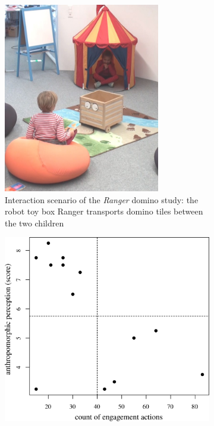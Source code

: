 \documentclass{frontiersSCNS} %
\begin{document}
\begin{figure}[b]
        \centering
        \begin{subfigure}[b]{0.48\columnwidth}
                \centering
                \includegraphics[width=0.75\textwidth]{ranger}
                \caption{Interaction scenario of the \emph{Ranger} domino study:
                the robot toy box Ranger transports domino tiles between the two
                children}
                \label{fig:ranger-expe}
        \end{subfigure}%
        \hspace{0.5cm}
        \begin{subfigure}[b]{0.48\columnwidth}
            \includegraphics[width=\textwidth]{correlation}

\end{subfigure}
\end{figure}
\end{document}
